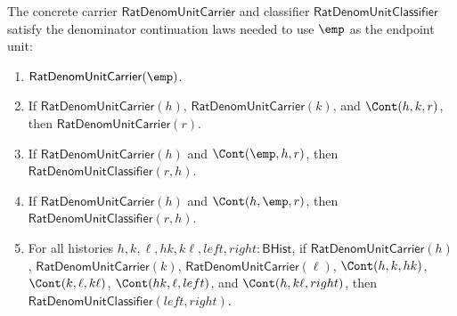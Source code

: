 \begin{theorem}
\label{thm:field-rat-denominator-continuation-adjoined-unit-laws}
The concrete carrier $\mathsf{RatDenomUnitCarrier}$ and classifier
$\mathsf{RatDenomUnitClassifier}$ satisfy the denominator continuation laws
needed to use $\emp$ as the endpoint unit:
\begin{enumerate}
\item $\mathsf{RatDenomUnitCarrier}(\emp)$.
\item If $\mathsf{RatDenomUnitCarrier}(h)$,
$\mathsf{RatDenomUnitCarrier}(k)$, and $\Cont(h,k,r)$, then
$\mathsf{RatDenomUnitCarrier}(r)$.
\item If $\mathsf{RatDenomUnitCarrier}(h)$ and $\Cont(\emp,h,r)$, then
$\mathsf{RatDenomUnitClassifier}(r,h)$.
\item If $\mathsf{RatDenomUnitCarrier}(h)$ and $\Cont(h,\emp,r)$, then
$\mathsf{RatDenomUnitClassifier}(r,h)$.
\item For all histories
$h,k,\ell,hk,k\ell,left,right:\mathsf{BHist}$, if
$\mathsf{RatDenomUnitCarrier}(h)$, $\mathsf{RatDenomUnitCarrier}(k)$,
$\mathsf{RatDenomUnitCarrier}(\ell)$, $\Cont(h,k,hk)$,
$\Cont(k,\ell,k\ell)$, $\Cont(hk,\ell,left)$, and
$\Cont(h,k\ell,right)$, then
$\mathsf{RatDenomUnitClassifier}(left,right)$.
\end{enumerate}
\end{theorem}
